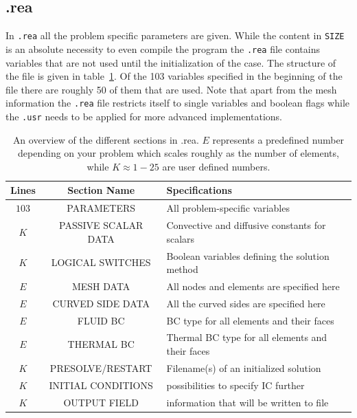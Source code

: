 \subsection{.rea}

In \verb|.rea| all the problem specific parameters are given. While the content in \verb|SIZE| 
is an absolute necessity to even compile the program the \verb|.rea| file contains variables 
that are not used until the initialization of the case. The structure of the file is given in table~\ref{tab:reafile}.
Of the 103 variables specified in the beginning of the file there are roughly 50 of them that are used. 
Note that apart from the mesh information the \verb|.rea| file restricts itself to single variables and boolean flags 
while the \verb|.usr| needs to be applied for more advanced implementations. 
%
\begin{table}[h]
    \centering
    \begin{tabular}{c c l}
       Lines & Section Name & Specifications \\ \hline
       $103$ & PARAMETERS & All problem-specific variables \\ 
       $K$ & PASSIVE SCALAR DATA & Convective and diffusive constants for scalars\\ 
       $K$ & LOGICAL SWITCHES & Boolean variables defining the solution method \\ 
       $E$ & MESH DATA & All nodes and elements are specified here\\
       $E$ & CURVED SIDE DATA & All the curved sides are specified here\\
       $E$ & FLUID BC& BC type for all elements and their faces\\
       $E$ & THERMAL BC& Thermal BC type for all elements and their faces\\
       $K$ & PRESOLVE/RESTART & Filename(s) of an initialized solution \\
       $K$ & INITIAL CONDITIONS & possibilities to specify IC further \\
       $K$ & OUTPUT FIELD & information that will be written to file\\
    \end{tabular}
    \caption{An overview of the different sections in .rea. $E$ represents a predefined number depending on your problem
    which scales roughly as the number of elements, while $K\approx 1-25$ are user defined numbers.}
    \label{tab:reafile}
\end{table}
%

